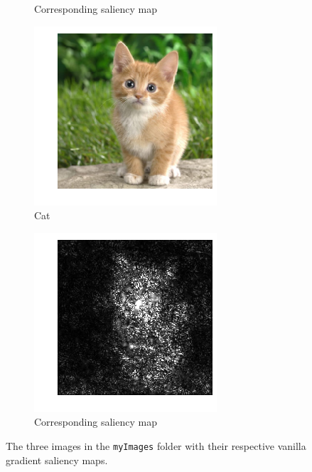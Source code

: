 \documentclass{article}
\def\code#1{\texttt{#1}}
\begin{document}
\begin{figure}[hbt!]
\begin{subfigure}{.33\textwidth}
    		\caption*{Corresponding saliency map}
    		\label{estcomp}
    	\end{subfigure}	
    	\medskip
    	\hfil
    	 \begin{subfigure}{.33\textwidth}
    		\includegraphics[width=\linewidth]{images/cat.png}
    		\caption{Cat}
    		\label{velcomp}
    	\end{subfigure}
    	\hfil
    	\begin{subfigure}{.33\textwidth}
    		\includegraphics[width=\linewidth]{images/cat_saliency.png}
    		\caption*{Corresponding saliency map}
    		\label{estcomp}
    	\end{subfigure}
    	\hfil	
    	\caption{The three images in the \code{myImages} folder with their respective vanilla gradient saliency maps.}
    	\label{fig:myImages}
    \end{figure}
\end{document}
